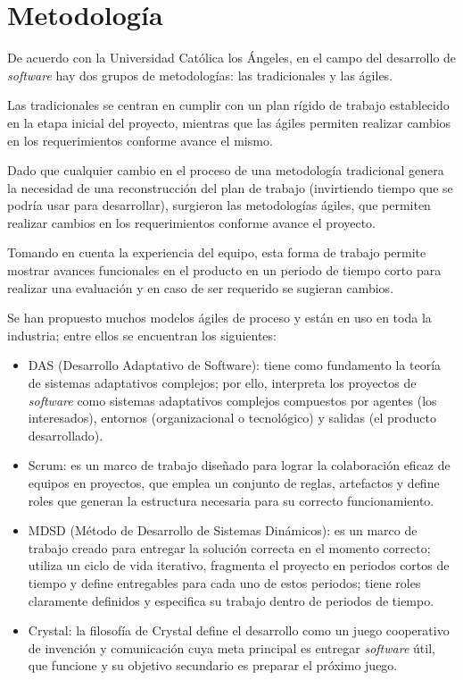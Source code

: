 
\section{Metodología}
De acuerdo con la Universidad Católica los Ángeles\cite{universidad_catolica_los_angeles_metodologidesarrollo_2020}, en el campo del desarrollo de \textit{software} hay dos grupos de metodologías: las tradicionales y las ágiles.


Las tradicionales se centran en cumplir con un plan rígido de trabajo establecido en la etapa inicial del proyecto, mientras que las ágiles permiten realizar cambios en los requerimientos conforme avance el mismo.


Dado que cualquier cambio en el proceso de una metodología tradicional genera la necesidad de una reconstrucción del plan de trabajo (invirtiendo tiempo que se podría usar para desarrollar), surgieron las metodologías ágiles, que permiten realizar cambios en los requerimientos conforme avance el proyecto.


Tomando en cuenta la experiencia del equipo, esta forma de trabajo permite mostrar avances funcionales en el producto en un periodo de tiempo corto para realizar una evaluación y en caso de ser requerido se sugieran cambios.


Se han propuesto muchos modelos ágiles de proceso y están en uso en toda la industria; entre ellos se encuentran los siguientes:


\begin{itemize}
	\item DAS (Desarrollo Adaptativo de Software): tiene como fundamento la teoría de sistemas adaptativos complejos; por ello, interpreta los proyectos de \textit{software} como sistemas adaptativos complejos compuestos
    por agentes (los interesados), entornos (organizacional o tecnológico) y salidas (el producto desarrollado)\cite{cadavid_revision_2013}.
	\item Scrum: es un marco de trabajo diseñado para lograr la colaboración eficaz de equipos en proyectos, que emplea un conjunto de reglas, artefactos y define roles que generan la estructura necesaria para su correcto funcionamiento\cite{cadavid_revision_2013}.
	\item MDSD (Método de Desarrollo de Sistemas Dinámicos): es un marco de trabajo creado para entregar la solución correcta en el momento correcto; utiliza un ciclo de vida iterativo, fragmenta el proyecto en periodos cortos de tiempo y define entregables para cada uno de estos periodos; tiene roles claramente definidos y especifica su trabajo dentro de periodos de tiempo\cite{cadavid_revision_2013}.
	\item Crystal: la filosofía de Crystal define el desarrollo como un juego cooperativo de invención y comunicación cuya meta principal es entregar \textit{software} útil, que funcione y su objetivo secundario es preparar el próximo juego\cite{cadavid_revision_2013}.
\end{itemize}

